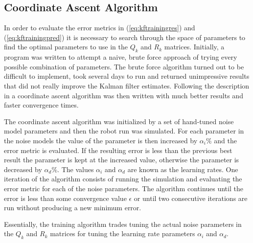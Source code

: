 \subsection{Coordinate Ascent Algorithm}
\label{sec:coordinateAscent}
In order to evaluate the error metrics in (\ref{eq:kftrainingres}) and (\ref{eq:kftrainingpred}) it is necessary to search through the space of parameters to find the optimal parameters to use in the $Q_k$ and $R_k$ matrices. Initially, a program was written to attempt a naive, brute force approach of trying every possible combination of parameters. The brute force algorithm turned out to be difficult to implement, took several days to run and returned unimpressive results that did not really improve the Kalman filter estimates. Following the description in \cite{Abbeel-RSS-05} a coordinate ascent algorithm was then written with much better results and faster convergence times.

The coordinate ascent algorithm was initialized by a set of hand-tuned noise model parameters and then the robot run was simulated. For each parameter in the noise models the value of the parameter is then increased by $\alpha_i \%$ and the error metric is evaluated. If the resulting error is less than the previous best result the parameter is kept at the increased value, otherwise the parameter is decreased by $\alpha_d \%$. The values $\alpha_i$ and $\alpha_d$ are known as the learning rates. One iteration of the algorithm consists of running the simulation and evaluating the error metric for each of the noise parameters. The algorithm continues until the error is less than some convergence value $\epsilon$ or until two consecutive iterations are run without producing a new minimum error.

Essentially, the training algorithm trades tuning the actual noise parameters in the $Q_k$ and $R_k$ matrices for tuning the learning rate parameters $\alpha_i$ and $\alpha_d$.
